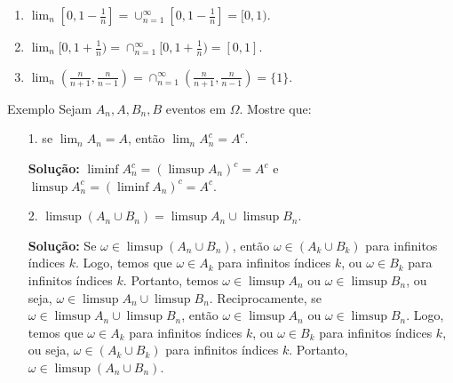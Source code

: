 \begin{frame}
%
%
\begin{exem}
\begin{enumerate}
\item $\lim_n [0,1-\frac{1}{n}]=\cup_{n=1}^{\infty}[0,1-\frac{1}{n}]=[0,1).$

\item $\lim_n [0,1+\frac{1}{n})=\cap_{n=1}^{\infty}[0,1+\frac{1}{n})=[0,1].$

\item $\lim_n (\frac{n}{n+1},\frac{n}{n-1})=\cap_{n=1}^{\infty}(\frac{n}{n+1},\frac{n}{n-1})=\{1\}.$
\end{enumerate}
\end{exem}
%
\begin{block}{Exemplo}
%
%
Sejam $A_n, A, B_n, B$ eventos em $\Omega$. Mostre que:
\begin{itemize}
\item[1.] se $\lim_n A_n=A$, então $\lim_n A_n^c=A^c$.

{\bf Solução:} $\liminf A_n^c=(\limsup A_n)^c=A^c$ e\\ $\limsup 
A_n^c=(\liminf A_n)^c=A^c$.

\item[2.] $\limsup (A_n\cup B_n)=\limsup A_n\cup\limsup B_n.$ 

{\bf Solução:} Se $\omega\in\limsup (A_n\cup B_n)$, então $\omega
\in(A_k\cup B_k)$ para infinitos índices $k$. Logo, temos que
$\omega \in A_k$ para infinitos índices $k$, ou $\omega \in B_k$
para infinitos índices $k$. Portanto, temos $\omega\in\limsup A_n$
ou $\omega\in\limsup B_n$, ou seja, $\omega\in \limsup
A_n\cup\limsup B_n$. Reciprocamente, se $\omega\in \limsup A_n\cup\limsup B_n$, então
$\omega\in\limsup A_n$ ou $\omega\in\limsup B_n$. Logo, temos que
$\omega \in A_k$ para infinitos índices $k$, ou $\omega \in B_k$
para infinitos índices $k$, ou seja, $\omega \in(A_k\cup B_k)$ para
infinitos índices $k$. Portanto, $\omega\in\limsup (A_n\cup B_n)$.
\end{itemize}
\end{block}
\end{frame}

